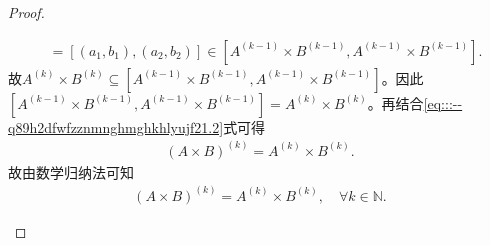 \documentclass[../../main.tex]{subfiles}%
\begin{document}
\begin{proof}
\begin{enumerate}[(1)]
\begin{align*}
&=\left[ \left( a_1,b_1 \right) ,\left( a_2,b_2 \right) \right] \in \left[ A^{\left( k-1 \right)}\times B^{\left( k-1 \right)},A^{\left( k-1 \right)}\times B^{\left( k-1 \right)} \right].
\end{align*}
故$A^{\left( k \right)}\times B^{\left( k \right)}\subseteq \left[ A^{\left( k-1 \right)}\times B^{\left( k-1 \right)},A^{\left( k-1 \right)}\times B^{\left( k-1 \right)} \right]$。因此$\left[ A^{\left( k-1 \right)}\times B^{\left( k-1 \right)},A^{\left( k-1 \right)}\times B^{\left( k-1 \right)} \right] =A^{\left( k \right)}\times B^{\left( k \right)}$。再结合\eqref{eq:::--q89h2dfwfzznmnghmghkhlyujf21.2}式可得
\begin{align*}
\left( A\times B \right) ^{\left( k \right)}=A^{\left( k \right)}\times B^{\left( k \right)}.
\end{align*}
故由数学归纳法可知
\begin{align*}
\left( A\times B \right) ^{\left( k \right)}=A^{\left( k \right)}\times B^{\left( k \right)},\quad \forall k\in \mathbb{N}.
\end{align*}


\end{enumerate}
\end{proof}
\end{document}
